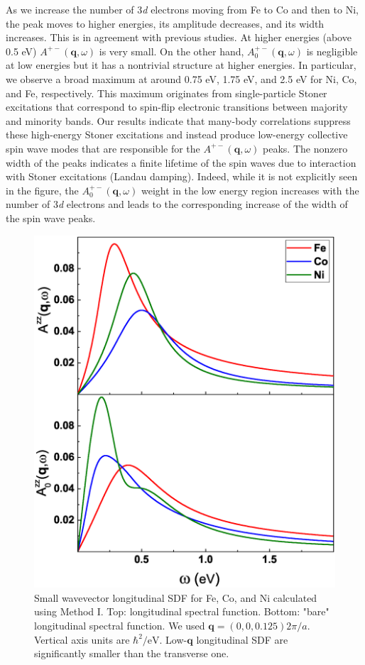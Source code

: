 As we increase the number of 3\emph{d} electrons moving from Fe to Co and then to Ni, the peak moves to higher energies, its amplitude decreases, and its width increases. This is in agreement with previous studies.\cite{Buczek} At higher energies (above 0.5 eV) $A^{+-}(\mathbf{q},\omega)$ is very small. On the other hand, $A_0^{+-}(\mathbf{q},\omega)$ is negligible at low energies but it has a nontrivial structure at higher energies. In particular, we observe a broad maximum at around 0.75 eV, 1.75 eV, and 2.5 eV for Ni, Co, and Fe, respectively. This maximum originates from single-particle Stoner excitations that correspond to spin-flip electronic transitions between majority and minority bands. Our results indicate that many-body correlations suppress these high-energy Stoner excitations and instead produce low-energy collective spin wave modes that are responsible for the $A^{+-}(\mathbf{q},\omega)$ peaks. The nonzero width of the peaks indicates a finite lifetime of the spin waves due to interaction with Stoner excitations (Landau damping). Indeed, while it is not explicitly seen in the figure, the $A_0^{+-}(\mathbf{q},\omega)$ weight in the low energy region increases with the number of 3\emph{d} electrons and leads to the corresponding increase of the width of the spin wave peaks.
\begin{figure}[h!]
\centering
\includegraphics[width=0.5\hsize]{Chapters/TDDFT/figures/Article/AzzLowQ.eps}
\caption{Small wavevector longitudinal SDF for Fe, Co, and Ni calculated using Method I. Top: longitudinal spectral function. Bottom: "bare" longitudinal spectral function. We used $\mathbf{q}=(0,0,0.125)2\pi/a$. Vertical axis units are $\hbar^2/\text{eV}$. Low-$\mathbf{q}$ longitudinal SDF are significantly smaller than the transverse one.}
\label{AzzLowQ}
\end{figure}

